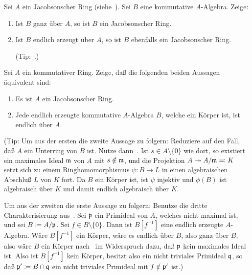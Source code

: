 \begin{exercise}
	Sei \(A\) ein Jacobsonscher Ring (siehe~).
	Sei \(B\) eine kommutative \(A\)-Algebra. Zeige:
	\begin{enumerate}
	\item
		Ist \(B\) ganz über \(A\), so ist \(B\) ein Jacobsonscher Ring.
	\item
		Ist \(B\) endlich erzeugt über \(A\), so ist \(B\) ebenfalls ein
		Jacobsonscher Ring.
		
		(Tip:~.)
	\end{enumerate}
\end{exercise}

\begin{exercise}
	Sei \(A\) ein kommutativer Ring. Zeige, daß die folgenden beiden
	Aussagen äquivalent sind:
	\begin{enumerate}
	\item
		Es ist \(A\) ein Jacobsonscher Ring.
	\item
		Jede endlich erzeugte kommutative \(A\)-Algebra \(B\), welche ein
		Körper ist, ist endlich über \(A\).
	\end{enumerate}
	
	(Tip: Um aus der ersten die zweite Aussage zu folgern: Reduziere auf den
	Fall, daß \(A\) ein Unterring von \(B\) ist. Nutze
	dann~. Ist
	\(s \in A \setminus \{0\}\) wie dort, so existiert ein maximales Ideal
	\(\mathfrak{m}\) von \(A\) mit \(s \notin \mathfrak{m}\), und die
	Projektion \(A \twoheadrightarrow A/\mathfrak{m} \eqqcolon K\) setzt sich zu einem
	Ringhomomorphismus \(\psi\colon B \to L\) in einen algebraischen Abschluß
	\(L\) von \(K\) fort. Da \(B\) ein Körper ist, ist \(\psi\) injektiv
	und \(\phi(B)\) ist algebraisch über \(K\) und damit endlich algebraisch
	über \(K\).
	
	Um aus der zweiten die erste Aussage zu folgern: Benutze die dritte
	Charakterisierung aus~. Sei \(\mathfrak{p}\)
	ein Primideal von \(A\), welches nicht maximal ist, und sei
	\(B \coloneqq A/\mathfrak{p}\). Sei \(f \in B \setminus \{0\}\). Dann ist
	\(B[f^{-1}]\) eine endlich erzeugte \(A\)-Algebra. Wäre \(B[f^{-1}]\) ein
	Körper, wäre es endlich über \(B\), also ganz über \(B\), also wäre
	\(B\) ein Körper nach~ im
	Widerspruch dazu, daß \(\mathfrak{p}\) kein maximales Ideal ist. Also ist
	\(B[f^{-1}]\) kein Körper, besitzt also ein nicht triviales Primideal
	\(\mathfrak{q}\), so daß \(\mathfrak{p}' \coloneqq B \cap \mathfrak{q}\) ein nicht
	triviales Primideal mit \(f \notin \mathfrak{p}'\) ist.)
\end{exercise}


